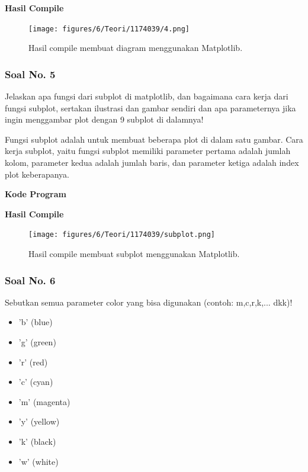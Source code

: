 \hfill \break
\textbf{Hasil Compile}

\begin{figure}[H]
	\texttt{[image: figures/6/Teori/1174039/4.png]}
	\centering
	\caption{Hasil compile membuat diagram menggunakan Matplotlib.}
\end{figure}

\subsubsection{Soal No. 5}
\hfill \break
Jelaskan apa fungsi dari subplot di matplotlib, dan bagaimana cara kerja dari fungsi subplot, sertakan ilustrasi dan gambar sendiri dan apa parameternya jika ingin menggambar plot dengan 9 subplot di dalamnya!

\hfill \break
Fungsi subplot adalah untuk membuat beberapa plot di dalam satu gambar.
\hfill \break
Cara kerja subplot, yaitu fungsi subplot memiliki parameter pertama adalah jumlah kolom, parameter kedua adalah jumlah baris, dan parameter ketiga adalah index plot keberapanya.

\hfill \break
\textbf{Kode Program}



\hfill \break
\textbf{Hasil Compile}

\begin{figure}[H]
	\texttt{[image: figures/6/Teori/1174039/subplot.png]}
	\centering
	\caption{Hasil compile membuat subplot menggunakan Matplotlib.}
\end{figure}

\subsubsection{Soal No. 6}
\hfill \break
Sebutkan semua parameter color yang bisa digunakan (contoh:  m,c,r,k,...  dkk)!

\begin{itemize}
	\item 'b' (blue)
	\item 'g' (green)
	\item 'r' (red)
	\item 'c' (cyan)
	\item 'm' (magenta)
	\item 'y' (yellow)
	\item 'k' (black)
	\item 'w' (white)
\end{itemize}


